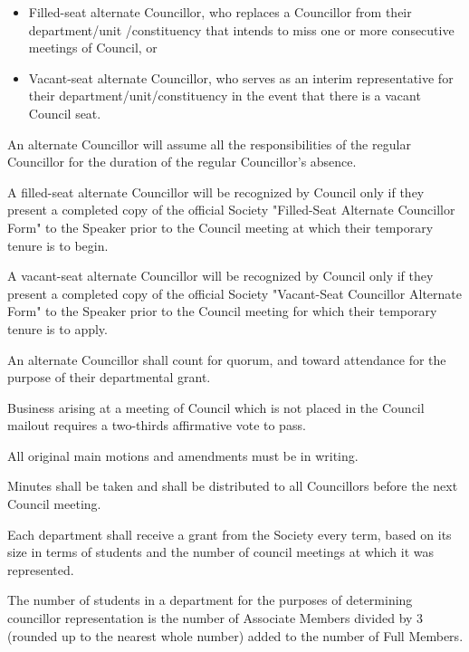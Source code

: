 \begin{longenum}[ label*=\thesubsection.\arabic*., align=left]
\begin{longenum}[ label*=\arabic*., align=left]
\begin{itemize}
		\item Filled-seat alternate Councillor, who replaces a Councillor from their department/unit /constituency that intends to miss one or more consecutive meetings of Council, or
		\item Vacant-seat alternate Councillor, who serves as an interim representative for their department/unit/constituency in the event that there is a vacant Council seat.
		\end{itemize}	 
		An alternate Councillor will assume all the responsibilities of the regular Councillor for the duration of the regular Councillor's absence.
        \item A filled-seat alternate Councillor will be recognized by Council only if they present a completed copy of the official Society "Filled-Seat Alternate Councillor Form" to the Speaker prior to the Council meeting at which their temporary tenure is to begin.
        \item A vacant-seat alternate Councillor will be recognized by Council only if they present a completed copy of the official Society "Vacant-Seat Councillor Alternate Form" to the Speaker prior to the Council meeting for which their temporary tenure is to apply. 
        \item An alternate Councillor shall count for quorum, and toward attendance for the purpose of their departmental grant. 
	\end{longenum}
    \item Business arising at a meeting of Council which is not placed in the Council mailout requires a two-thirds affirmative vote to pass.

    \item All original main motions and amendments must be in writing.
    \item Minutes shall be taken and shall be distributed to all Councillors before the next Council meeting.
    \item Each department shall receive a grant from the Society every term, based on its size in terms of students and the number of council meetings at which it was represented.
    \item The number of students in a department for the purposes of determining councillor representation is the number of Associate Members divided by 3 (rounded up to the nearest whole number) added to the number of Full Members. 


\end{longenum}
